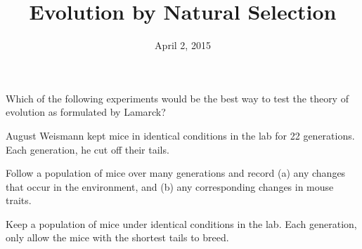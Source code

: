 





\title[Natural Selection]{Evolution by Natural Selection}
\date{April 2, 2015}



\begin{noheadline}
\maketitle
\end{noheadline}


\begin{noheadline}
\begin{frame}
    \begin{clickerquestion}
        \item Which of the following experiments would be the best way to test
            the theory of evolution as formulated by Lamarck?
 
        \begin{clickeroptions}
            \item August Weismann kept mice in identical conditions in the lab
                for 22 generations. Each generation, he cut off their tails.

            \item Follow a population of mice over many generations and record
                (a) any changes that occur in the environment, and (b) any
                corresponding changes in mouse traits. 

            \item {}

            \item Keep a population of mice under identical conditions in the
                lab. Each generation, only allow the mice with the shortest
                tails to breed. 
        \end{clickeroptions}
    \end{clickerquestion}
\end{frame}
\end{noheadline}

